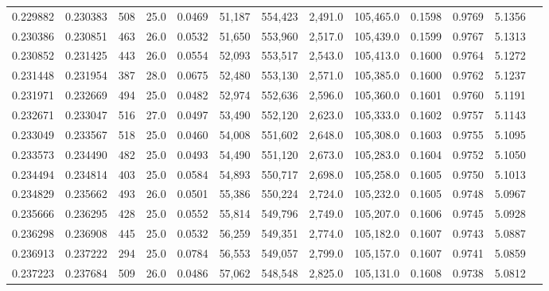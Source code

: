\begin{tabular}{rrrrrrrrrrrrr}
0.229882 & 0.230383 &   508 & 25.0 &                                     0.0469 &  51,187 & 554,423 &   2,491.0 & 105,465.0 & 0.1598 & 0.9769 & 5.1356 \\
0.230386 & 0.230851 &   463 & 26.0 &                                     0.0532 &  51,650 & 553,960 &   2,517.0 & 105,439.0 & 0.1599 & 0.9767 & 5.1313 \\
0.230852 & 0.231425 &   443 & 26.0 &                                     0.0554 &  52,093 & 553,517 &   2,543.0 & 105,413.0 & 0.1600 & 0.9764 & 5.1272 \\
0.231448 & 0.231954 &   387 & 28.0 &                                     0.0675 &  52,480 & 553,130 &   2,571.0 & 105,385.0 & 0.1600 & 0.9762 & 5.1237 \\
0.231971 & 0.232669 &   494 & 25.0 &                                     0.0482 &  52,974 & 552,636 &   2,596.0 & 105,360.0 & 0.1601 & 0.9760 & 5.1191 \\
0.232671 & 0.233047 &   516 & 27.0 &                                     0.0497 &  53,490 & 552,120 &   2,623.0 & 105,333.0 & 0.1602 & 0.9757 & 5.1143 \\
0.233049 & 0.233567 &   518 & 25.0 &                                     0.0460 &  54,008 & 551,602 &   2,648.0 & 105,308.0 & 0.1603 & 0.9755 & 5.1095 \\
0.233573 & 0.234490 &   482 & 25.0 &                                     0.0493 &  54,490 & 551,120 &   2,673.0 & 105,283.0 & 0.1604 & 0.9752 & 5.1050 \\
0.234494 & 0.234814 &   403 & 25.0 &                                     0.0584 &  54,893 & 550,717 &   2,698.0 & 105,258.0 & 0.1605 & 0.9750 & 5.1013 \\
0.234829 & 0.235662 &   493 & 26.0 &                                     0.0501 &  55,386 & 550,224 &   2,724.0 & 105,232.0 & 0.1605 & 0.9748 & 5.0967 \\
0.235666 & 0.236295 &   428 & 25.0 &                                     0.0552 &  55,814 & 549,796 &   2,749.0 & 105,207.0 & 0.1606 & 0.9745 & 5.0928 \\
0.236298 & 0.236908 &   445 & 25.0 &                                     0.0532 &  56,259 & 549,351 &   2,774.0 & 105,182.0 & 0.1607 & 0.9743 & 5.0887 \\
0.236913 & 0.237222 &   294 & 25.0 &                                     0.0784 &  56,553 & 549,057 &   2,799.0 & 105,157.0 & 0.1607 & 0.9741 & 5.0859 \\
0.237223 & 0.237684 &   509 & 26.0 &                                     0.0486 &  57,062 & 548,548 &   2,825.0 & 105,131.0 & 0.1608 & 0.9738 & 5.0812 \\

\end{tabular}

